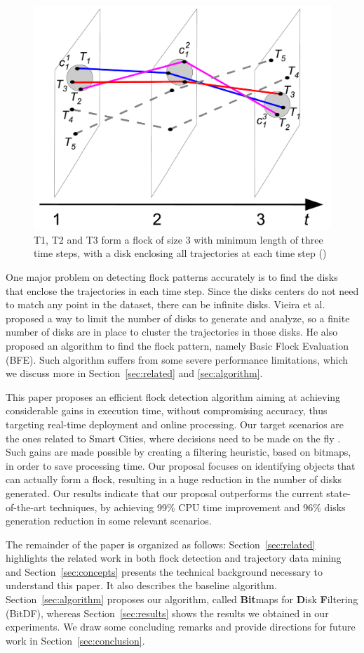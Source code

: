 \begin{figure}
    \centering
    \includegraphics[width=0.7\linewidth]{images/flock_pattern.png}
    \caption{T1, T2 and T3 form a flock of size 3 with minimum length of three time steps, with a disk enclosing all
        trajectories at each time step (\hspace{-0.005cm}\cite{bib:vieira})}
    \label{fig:flocks}
\end{figure}

One major problem on detecting flock patterns accurately is to find the disks that enclose the trajectories in each time
step. Since the disks centers do not need to match any point in the dataset, there can be infinite disks. Vieira et al.
\cite{bib:vieira} proposed a way to limit the number of disks to generate and analyze, so a finite number of disks are
in place to cluster the trajectories in those disks. He also proposed an algorithm to find the flock pattern, namely
Basic Flock Evaluation (BFE). Such algorithm suffers from some severe performance limitations, which we discuss more in
Section~\ref{sec:related} and \ref{sec:algorithm}.

This paper proposes an efficient flock detection algorithm aiming at achieving considerable gains in execution time,
without compromising accuracy, thus targeting real-time deployment and online processing. Our target scenarios are the
ones related to Smart Cities, where decisions need to be made on the fly
\cite{bib:ieeesmartcities}\cite{bib:springersmartcities}. Such gains are made possible by creating a filtering
heuristic, based on bitmaps, in order to save processing time. Our proposal focuses on identifying objects that can
actually form a flock, resulting in a huge reduction in the number of disks generated. Our results indicate that our
proposal outperforms the current state-of-the-art techniques, by achieving 99\% CPU time improvement and 96\% disks
generation reduction in some relevant scenarios.

The remainder of the paper is organized as follows: Section~\ref{sec:related} highlights the related work in both flock
detection and trajectory data mining and Section~\ref{sec:concepts} presents the technical background necessary to
understand this paper. It also describes the baseline algorithm. Section~\ref{sec:algorithm} proposes our algorithm,
called \textbf{Bit}maps for \textbf{D}isk \textbf{F}iltering (BitDF), whereas Section~\ref{sec:results} shows the
results we obtained in our experiments. We draw some concluding remarks and provide directions for future work in
Section~\ref{sec:conclusion}.
